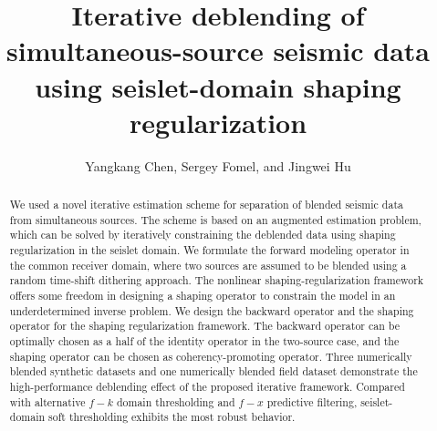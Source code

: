 
\title{Iterative deblending of simultaneous-source seismic data using seislet-domain shaping regularization}
\renewcommand{\thefootnote}{\fnsymbol{footnote}}
\author{Yangkang Chen, Sergey Fomel, and Jingwei Hu}


\address{
Bureau of Economic Geology \\
John A. and Katherine G. Jackson School of Geosciences \\
The University of Texas at Austin \\
University Station, Box X \\
Austin, TX 78713-8924 \\
}

\maketitle

\begin{abstract}
We used a novel iterative estimation scheme for separation of blended seismic data from simultaneous sources. The scheme is based on an augmented estimation problem, which can be solved by  iteratively constraining the deblended data using shaping regularization in the seislet domain. We formulate the forward modeling operator in the common receiver domain, where two sources are assumed to be blended using a random time-shift dithering approach. The nonlinear shaping-regularization framework offers some freedom in designing a shaping operator to constrain the model in an underdetermined inverse problem. We design the backward operator and the shaping operator for the shaping regularization framework. The backward operator can be optimally chosen as a half of the identity operator in the two-source case, and the shaping operator can be chosen as coherency-promoting operator. Three numerically blended synthetic datasets and one numerically blended field dataset demonstrate the high-performance deblending effect of the proposed iterative framework. Compared with alternative $f-k$ domain thresholding and $f-x$ predictive filtering, seislet-domain soft thresholding exhibits the most robust behavior.
\end{abstract}

